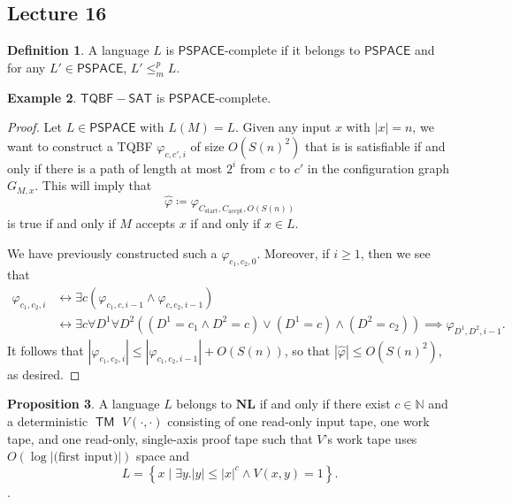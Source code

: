 \documentclass[10pt,letterpaper,cm]{nupset}
\theoremstyle{definition}
\newtheorem{definition}{Definition}[subsection]
\newtheorem{exmp}[definition]{Example}
\theoremstyle{theorem}
\newtheorem{prop}[definition]{Proposition}
\theoremstyle{remark}
\newcommand{\N}{\mathbb N}
\newcommand{\1}{\mathbf{1}}
\newcommand{\accpt}{\mathrm{accpt}}
\newcommand{\0}{\vec 0}
\DeclareMathOperator{\TM}{\mathsf{TM}}
\begin{document}
\subsection{Lecture 16}

\begin{definition}
A language $L$ is $\mathsf{PSPACE}$-complete if it belongs to $\mathsf{PSPACE}$ and for any $L' \in \mathsf{PSPACE}$, $L' \leq_m^p L$.
\end{definition}

\begin{exmp}
$\mathsf{TQBF{-}SAT} $ is $\mathsf{PSPACE}$-complete.
\end{exmp}
\begin{proof}
Let $L \in \mathsf{PSPACE}$ with $L(M) = L$. Given any input $x$ with $\left\lvert{x}\right\rvert =n$, we want to construct a TQBF $\varphi_{c, c', i}$ of size $O(S(n)^2)$ that is is satisfiable if and only if there is a path of length at most $2^i$ from $c$ to $c'$ in the configuration graph $G_{M,x}$. This will imply that $$\hat{\varphi}\coloneqq \varphi_{C_{\mathrm{start}}, C_{\accpt}, O(S(n))}$$ is true if and only if $M$ accepts $x$ if and only if $x\in L$.


 We have previously constructed such a $\varphi_{c_1, c_2, 0}$. Moreover, if $i\geq 1$, then we see that 
\begin{align*}
\varphi_{c_1, c_2, i} & \leftrightarrow \exists c\left(\varphi_{c_1, c, i-1} \land \varphi_{c, c_2, i-1}\right)
\\ & \leftrightarrow \exists c \forall D^1 \forall D^2\left(\left(D^1 = c_1 \land D^2 = c\right) \vee \left(D^1 = c\right) \land \left(D^2 = c_2\right)\right) \implies \varphi_{D^1, D^2, i-1}.
\end{align*}
It follows that $\left\lvert{\varphi_{c_1, c_2, i}}\right\rvert\leq \left\lvert{\varphi_{c_1, c_2, i-1}}\right\rvert +O(S(n))$, so that $\left\lvert{\hat{\varphi}}\right\rvert \leq O(S(n)^2)$, as desired.
\end{proof}

\begin{prop}
A language $L$ belongs to $\mathbf{NL}$ if and only if there exist $c\in \N$ and a deterministic $\TM$ $V(\cdot, \cdot)$ consisting of one read-only input tape, one work tape, and one read-only, single-axis proof tape  such that $V$'s work tape uses $O(\log{\left\lvert{\text{(first input)}}\right\rvert})$ space and $$L = \left\{ x \mid \exists y.\left\lvert{y}\right\rvert \leq \left\lvert{x}\right\rvert^{c} \land V\left(x,y\right) = 1\right\}.$$ .
\end{prop}
\end{document}
